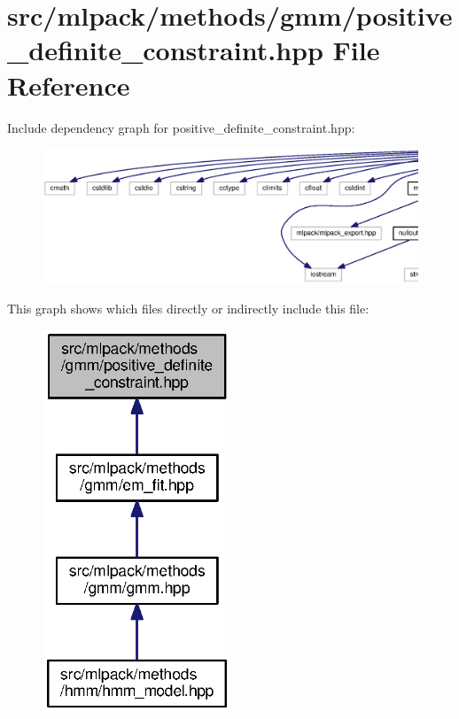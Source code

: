 \section{src/mlpack/methods/gmm/positive\+\_\+definite\+\_\+constraint.hpp File Reference}
\label{positive__definite__constraint_8hpp}
Include dependency graph for positive\+\_\+definite\+\_\+constraint.\+hpp\+:
\nopagebreak
\begin{figure}[H]
\begin{center}
\leavevmode
\includegraphics[width=350pt]{positive__definite__constraint_8hpp__incl}
\end{center}
\end{figure}
This graph shows which files directly or indirectly include this file\+:
\nopagebreak
\begin{figure}[H]
\begin{center}
\leavevmode
\includegraphics[width=160pt]{positive__definite__constraint_8hpp__dep__incl}
\end{center}
\end{figure}
